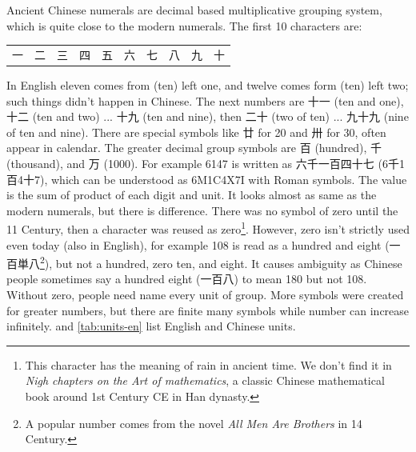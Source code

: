 \documentclass[b5paper]{article}
\begin{document}
Ancient Chinese numerals are decimal based multiplicative grouping system, which is quite close to the modern numerals. The first 10 characters are:

\begin{center}
\begin{tabular}{cccccccccc}
{一} & {二} & {三} & {四} & {五} & {六} & {七} & {八} & {九} & {十} \\
\end{tabular}
\end{center}

In English eleven comes from (ten) left one, and twelve comes form (ten) left two; such things didn't happen in Chinese. The next numbers are {十一} (ten and one), {十二} (ten and two) ... {十九} (ten and nine), then {二十} (two of ten) ... {九十九} (nine of ten and nine). There are special symbols like {廿} for 20 and {卅} for 30, often appear in calendar. The greater decimal group symbols are {百} (hundred), {千} (thousand), and {万} (1000). For example 6147 is written as {六千一百四十七 (6千1百4十7)}, which can be understood as 6M1C4X7I with Roman symbols. The value is the sum of product of each digit and unit. It looks almost as same as the modern numerals, but there is difference. There was no symbol of zero until the 11 Century, then a character was reused as zero\footnote{This character has the meaning of rain in ancient time. We don't find it in {\em Nigh chapters on the Art of mathematics}, a classic Chinese mathematical book around 1st Century CE in Han dynasty.}. However, zero isn't strictly used even today (also in English), for example 108 is read as a hundred and eight (一百単八\footnote{A popular number comes from the novel {\em All Men Are Brothers} in 14 Century.}), but not a hundred, zero ten, and eight. It causes ambiguity as Chinese people sometimes say a hundred eight (一百八) to mean 180 but not 108. Without zero, people need name every unit of group. More symbols were created for greater numbers, but there are finite many symbols while number can increase infinitely.  and \cref{tab:units-en} list English and Chinese units.
\end{document}
